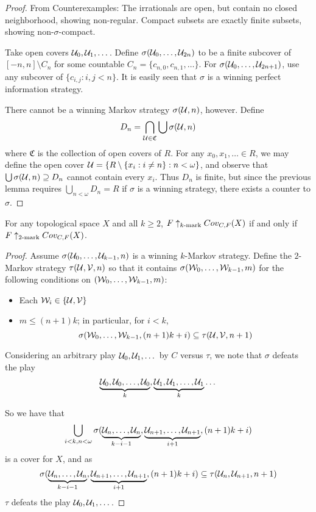   \begin{proof}
  From Counterexamples: The irrationals are open, but contain no closed neighborhood, showing non-regular. Compact subsets are exactly finite subsets, showing non-$\sigma$-compact.

  Take open covers $\mathcal{U}_0,\mathcal{U}_1,\dots$. Define $\sigma(\mathcal{U}_0,\dots,\mathcal{U}_{2n})$ to be a finite subcover of $[-n,n]\setminus C_n$ for some countable $C_n=\{c_{n,0}, c_{n,1}, \dots\}$. For $\sigma(\mathcal{U}_0,\dots,\mathcal{U}_{2n+1})$, use any subcover of $\{c_{i,j} : i,j < n\}$. It is easily seen that $\sigma$ is a winning perfect information strategy.

  There cannot be a winning Markov strategy $\sigma(\mathcal{U},n)$, however. Define 
      \[
        D_n = \bigcap_{\mathcal{U}\in\mathfrak{C}} \bigcup\sigma(\mathcal{U},n)
      \]
  where $\mathfrak{C}$ is the collection of open covers of $R$. For any $x_0,x_1,\dots \in R$, we may define the open cover $\mathcal{U} = \{R \setminus \{x_i: i \not= n\} : n < \omega \}$, and observe that $\bigcup \sigma(\mathcal{U},n) \supseteq D_n$ cannot contain every $x_i$. Thus $D_n$ is finite, but since the previous lemma requires $\bigcup_{n<\omega} D_n = R$ if $\sigma$ is a winning strategy, there exists a counter to $\sigma$.
  \end{proof}

  \begin{theorem}
  For any topological space $X$ and all $k \geq 2$, $F \uparrow_{k\text{-mark}} Cov_{C,F}(X)$ if and only if $F \uparrow_{2\text{-mark}} Cov_{C,F}(X)$.
  \end{theorem}

  \begin{proof}
  Assume $\sigma(\mathcal{U}_0,\dots,\mathcal{U}_{k-1},n)$ is a winning $k$-Markov strategy. Define the $2$-Markov strategy $\tau(\mathcal{U},\mathcal{V},n)$ so that it contains $\sigma(\mathcal{W}_0,\dots,\mathcal{W}_{k-1},m)$ for the following conditions on $(\mathcal{W}_0,\dots,\mathcal{W}_{k-1},m)$:
    \begin{itemize}
    \item Each $\mathcal{W}_i \in \{\mathcal{U},\mathcal{V}\}$
    \item $m \leq (n+1)k$; in particular, for $i<k$, 
      \[
        \sigma(\mathcal{W}_0,\dots,\mathcal{W}_{k-1},(n+1)k+i)
        \subseteq 
        \tau(\mathcal{U},\mathcal{V},n+1) 
      \]
    \end{itemize}

  Considering an arbitrary play $\mathcal{U}_0, \mathcal{U}_1, \dots$ by $C$ versus $\tau$, we note that $\sigma$ defeats the play 
  \[
    \underbrace{\mathcal{U}_0,\mathcal{U}_0,\dots,\mathcal{U}_0}_{k},
    \underbrace{\mathcal{U}_1,\mathcal{U}_1,\dots,\mathcal{U}_1}_{k}
    \dots
  \]

  So we have that
    \[
      \bigcup_{i<k, n<\omega} \sigma(
      \underbrace{\mathcal{U}_n,\dots,\mathcal{U}_n}_{k-i-1},
      \underbrace{\mathcal{U}_{n+1},\dots,\mathcal{U}_{n+1}}_{i+1},
      (n+1)k+i)
    \]
  is a cover for $X$, and as 
    \[
      \sigma(
      \underbrace{\mathcal{U}_n,\dots,\mathcal{U}_n}_{k-i-1},
      \underbrace{\mathcal{U}_{n+1},\dots,\mathcal{U}_{n+1}}_{i+1},
      (n+1)k+i)
      \subseteq 
      \tau(\mathcal{U}_n,\mathcal{U}_{n+1},n+1)
    \]
  $\tau$ defeats the play $\mathcal{U}_0, \mathcal{U}_1, \dots$.
  \end{proof}


